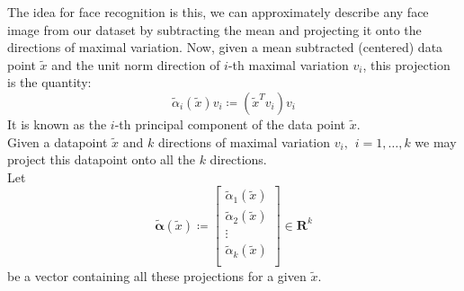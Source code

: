 The idea for face recognition is this, we can approximately describe any face image from our dataset by subtracting the mean and projecting it onto the directions of maximal variation. 
Now, given a mean subtracted (centered) data point $\tilde{x}$ and the unit norm direction of $i$-th maximal variation $v_i$, this projection is the quantity:
\begin{equation*}
   \tilde{\alpha}_i(\tilde{x})v_i \coloneqq (\tilde{x}^Tv_i)v_i 
\end{equation*}
It is known as the $i$-th principal component of the data point $\tilde{x}$. 
\\
Given a datapoint $\tilde{x}$ and $k$ directions of maximal variation $v_i, \hspace{5pt} i=1, \hdots, k$ we may project this datapoint onto all the $k$ directions.
\\
Let 
\begin{equation*}
    \tilde{\mathbf{\alpha}}(\tilde{x}) \coloneqq 
    \begin{bmatrix}
        \tilde{\alpha}_1(\tilde{x}) \\
        \tilde{\alpha}_2(\tilde{x}) \\
        \vdots\\
        \tilde{\alpha}_k(\tilde{x}) \\
    \end{bmatrix}
    \in \mathbf{R}^{k}
\end{equation*}
be a vector containing all these projections for a given $\tilde{x}$.
